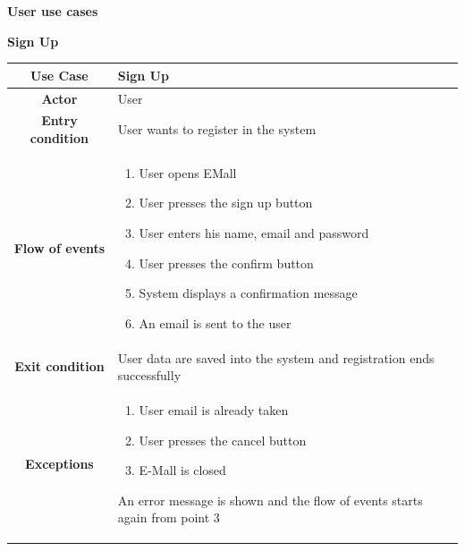 \documentclass[table, 12pt]{article} %
\begin{document}
        \begin{itemize}
            \item \textbf {User use cases}

            \begin{table}[H]
                \item[] \textbf{Sign Up}
                \item[]
                \centering
                \begin{tabular}{|c |m{}|}
                    \hline
                    \textbf{Use Case} & Sign Up\\ \hline
                    \textbf{Actor} & User\\ \hline
                    \textbf{Entry condition} & User wants to register in the system\\  \hline
                    \textbf{Flow of events} & \begin{enumerate}
                                                \item User opens EMall
                                                \item User presses the sign up button
                                                \item User enters his name, email and password
                                                \item User presses the confirm button
                                                \item System displays a confirmation message
                                                \item An email is sent to the user

                                            \end{enumerate}\\ \hline
                    \textbf{Exit condition} & User data are saved into the system and registration ends successfully  \\ \hline
                    \textbf{Exceptions} &  \begin{enumerate}
                        \item User email is already taken
                        \item User presses the cancel button
                        \item E-Mall is closed
                    \end{enumerate}
                    An error message is shown and the flow of events starts again from point 3\\ \hline
                \end{tabular}
            \end{table}



\end{itemize}
\end{document}
